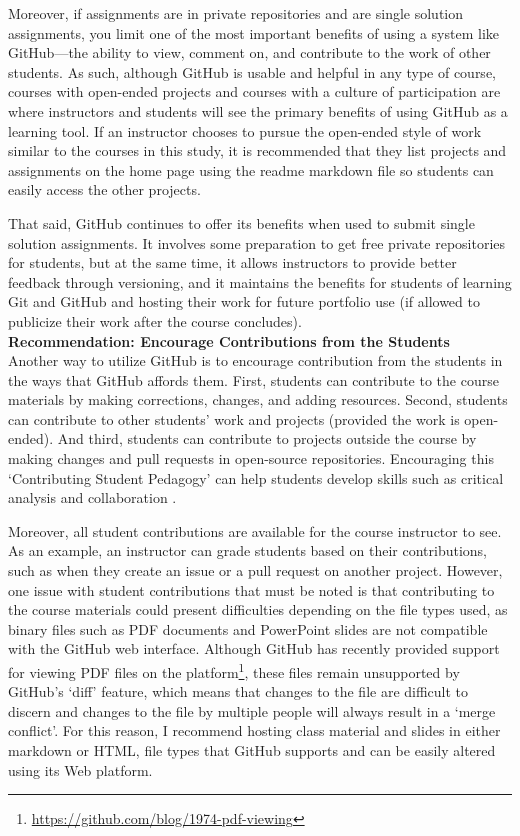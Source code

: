 Moreover, if assignments are in private repositories and are single solution assignments, you limit one of the most important benefits of using a system like GitHub---the ability to view, comment on, and contribute to the work of other students. As such, although GitHub is usable and helpful in any type of course, courses with open-ended projects and courses with a culture of participation are where instructors and students will see the primary benefits of using GitHub as a learning tool. If an instructor chooses to pursue the open-ended style of work similar to the courses in this study, it is recommended that they list projects and assignments on the home page using the readme markdown file so students can easily access the other projects.

That said, GitHub continues to offer its benefits when used to submit single solution assignments. It involves some preparation to get free private repositories for students, but at the same time, it allows instructors to provide better feedback through versioning, and it maintains the benefits for students of learning Git and GitHub and hosting their work for future portfolio use (if allowed to publicize their work after the course concludes). \\

\textbf{Recommendation: Encourage Contributions from the Students} \\
Another way to utilize GitHub is to encourage contribution from the students in the ways that GitHub affords them. First, students can contribute to the course materials by making corrections, changes, and adding resources. Second, students can contribute to other students' work and projects (provided the work is open-ended). And third, students can contribute to projects outside the course by making changes and pull requests in open-source repositories. Encouraging this `Contributing Student Pedagogy' can help students develop skills such as critical analysis and collaboration \cite{falkner2012supporting}.

Moreover, all student contributions are available for the course instructor to see. As an example, an instructor can grade students based on their contributions, such as when they create an issue or a pull request on another project. However, one issue with student contributions that must be noted is that contributing to the course materials could present difficulties depending on the file types used, as binary files such as PDF documents and PowerPoint slides are not compatible with the GitHub web interface. Although GitHub has recently provided support for viewing PDF files on the platform\footnote{\url{https://github.com/blog/1974-pdf-viewing}}, these files remain unsupported by GitHub's `diff' feature, which means that changes to the file are difficult to discern and changes to the file by multiple people will always result in a `merge conflict'. For this reason, I recommend hosting class material and slides in either markdown or HTML, file types that GitHub supports and can be easily altered using its Web platform.

